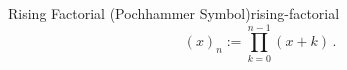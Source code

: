 \begin{definition}{Rising Factorial (Pochhammer Symbol)}{rising-factorial}
  $$(x)_n := \prod_{k=0}^{n-1} (x+k)\,.$$
\end{definition}
